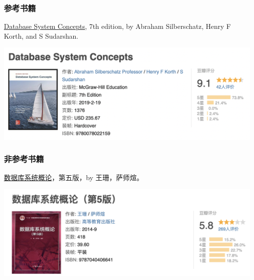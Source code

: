 \documentclass[aspectratio=169, 14pt]{beamer}
\begin{document}
\begin{frame}
    \frametitle{参考书籍}
    \href{https://book.douban.com/subject/30345517/}{Database System Concepts}, 7th edition, by Abraham Silberschatz, Henry F Korth, and S Sudarshan.
    \begin{center}
        \includegraphics[height=.5\paperheight]{image/dsc-book}
    \end{center}
\end{frame}

\begin{frame}
    \frametitle{非参考书籍}
    \href{https://book.douban.com/subject/26317662/}{数据库系统概论}，第五版，by 王珊，萨师煊。
    \begin{center}
        \includegraphics[height=.5\paperheight]{image/book2}
    \end{center}

\end{frame}
\end{document}
